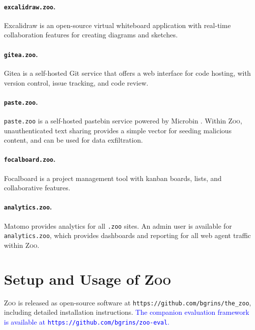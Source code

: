 \documentclass{article} %
\newcommand{\maricolor}{blue}
\newcommand{\zoo}{\textsc{Zoo}}
\begin{document}
\paragraph{\texttt{excalidraw.zoo}.}
Excalidraw \citep{excalidraw} is an open-source virtual whiteboard application with real-time collaboration features for creating diagrams and sketches.

\paragraph{\texttt{gitea.zoo}.}
Gitea \citep{gitea} is a self-hosted Git service that offers a web interface for code hosting, with version control, issue tracking, and code review.

\paragraph{\texttt{paste.zoo}.}
\texttt{paste.zoo} is a self-hosted pastebin service powered by Microbin \citep{microbin}.
Within \zoo{}, unauthenticated text sharing provides a simple vector for seeding malicious content, and can be used for data exfiltration.

\paragraph{\texttt{focalboard.zoo}.}
Focalboard \citep{focalboard} is a project management tool with kanban boards, lists, and collaborative features.

\paragraph{\texttt{analytics.zoo}.}
Matomo \citep{matomo} provides analytics for all \texttt{.zoo} sites.
An admin user is available for \texttt{analytics.zoo}, which provides dashboards and reporting for all web agent traffic within \zoo{}.

\section{Setup and Usage of \zoo{}}
\label{sec:operational}

\zoo{} is released as open-source software at \texttt{https://github.com/bgrins/the\_zoo}, including detailed installation instructions.
\textcolor{\maricolor}{The companion evaluation framework is available at \texttt{https://github.com/bgrins/zoo-eval}.}
\end{document}
